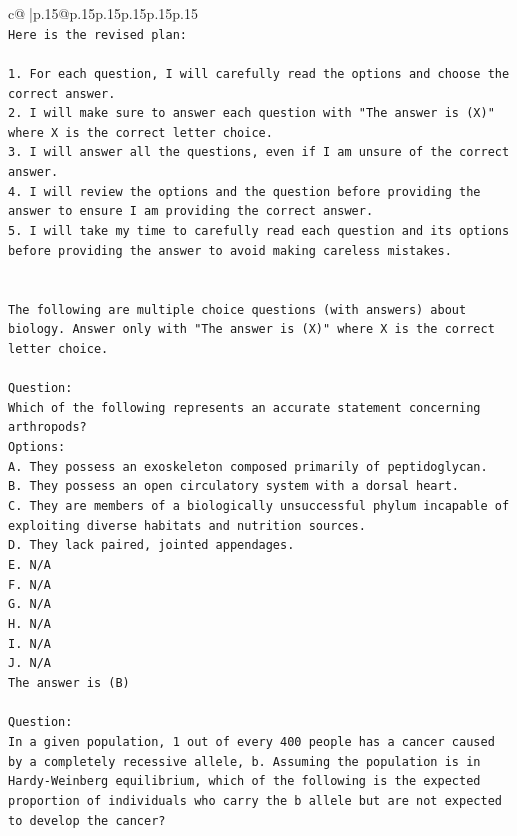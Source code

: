 \documentclass{article}
\begin{document}
{\begin{supertabular}{c@{$\;$}|p{.15\linewidth}@{}p{.15\linewidth}p{.15\linewidth}p{.15\linewidth}p{.15\linewidth}p{.15\linewidth}}
{{{\\ 
\texttt{Here is the revised plan:} \\
\\ 
\texttt{1. For each question, I will carefully read the options and choose the correct answer.} \\
\texttt{2. I will make sure to answer each question with "The answer is (X)" where X is the correct letter choice.} \\
\texttt{3. I will answer all the questions, even if I am unsure of the correct answer.} \\
\texttt{4. I will review the options and the question before providing the answer to ensure I am providing the correct answer.} \\
\texttt{5. I will take my time to carefully read each question and its options before providing the answer to avoid making careless mistakes.} \\
\\ 
\\ 
\texttt{The following are multiple choice questions (with answers) about biology. Answer only with "The answer is (X)" where X is the correct letter choice.} \\
\\ 
\texttt{Question:} \\
\texttt{Which of the following represents an accurate statement concerning arthropods?} \\
\texttt{Options:} \\
\texttt{A. They possess an exoskeleton composed primarily of peptidoglycan.} \\
\texttt{B. They possess an open circulatory system with a dorsal heart.} \\
\texttt{C. They are members of a biologically unsuccessful phylum incapable of exploiting diverse habitats and nutrition sources.} \\
\texttt{D. They lack paired, jointed appendages.} \\
\texttt{E. N/A} \\
\texttt{F. N/A} \\
\texttt{G. N/A} \\
\texttt{H. N/A} \\
\texttt{I. N/A} \\
\texttt{J. N/A} \\
\texttt{The answer is (B)} \\
\\ 
\texttt{Question:} \\
\texttt{In a given population, 1 out of every 400 people has a cancer caused by a completely recessive allele, b. Assuming the population is in Hardy{-}Weinberg equilibrium, which of the following is the expected proportion of individuals who carry the b allele but are not expected to develop the cancer?} \\
}}}
\end{supertabular}}
\end{document}
